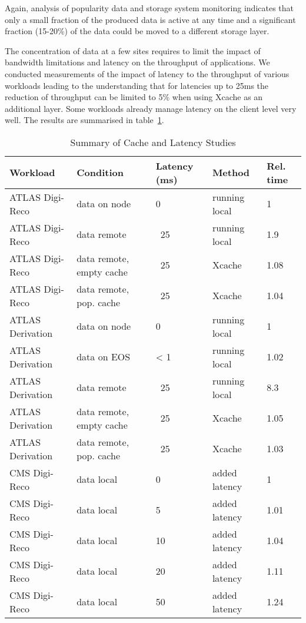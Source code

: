 Again, analysis of popularity data and storage system monitoring
indicates that only a small fraction of the produced data is active at
any time and a significant fraction (15-20\%) of the data could be
moved to a different storage layer.

The concentration of data at a few sites requires to limit the impact
of bandwidth limitations and latency on the throughput of
applications.  We conducted measurements of the impact of latency to
the throughput of various workloads leading to the understanding that
for latencies up to 25ms the reduction of throughput can be limited to
5\% when using Xcache as an additional layer. Some workloads already
manage latency on the client level very well. The results are
summarised in table~\ref{tab:latency}.
\begin{table}
  \centering
  \caption{ Summary of Cache and Latency Studies}
  \label{tab:latency}
  \begin{tabular}{lllll}
    \hline
    \textbf{Workload} & \textbf{Condition} & \textbf{Latency (ms)} & \textbf{Method} & \textbf{Rel. time}  \\\hline
    ATLAS Digi-Reco & data on node & 0 & running local & 1 \\ 
    ATLAS Digi-Reco & data remote & ~25 & running local & 1.9 \\ 
    ATLAS Digi-Reco & data remote, empty cache & ~25 & Xcache & 1.08 \\ 
    ATLAS Digi-Reco & data remote, pop. cache & ~25 & Xcache & 1.04 \\ 
    ATLAS Derivation & data on node & 0 & running local & 1 \\ 
    ATLAS Derivation & data on EOS & < 1 & running local  & 1.02 \\ 
    ATLAS Derivation & data remote & ~25 & running local & 8.3 \\ 
    ATLAS Derivation & data remote, empty cache & ~25 & Xcache & 1.05 \\ 
    ATLAS Derivation & data remote, pop. cache & ~25 & Xcache & 1.03 \\
    CMS Digi-Reco & data local & 0 & added latency & 1 \\
    CMS Digi-Reco & data local & 5 & added latency & 1.01 \\
    CMS Digi-Reco & data local & 10 & added latency & 1.04 \\
    CMS Digi-Reco & data local & 20 & added latency & 1.11 \\
    CMS Digi-Reco & data local & 50 & added latency & 1.24 \\\hline
  \end{tabular}
\end{table}

